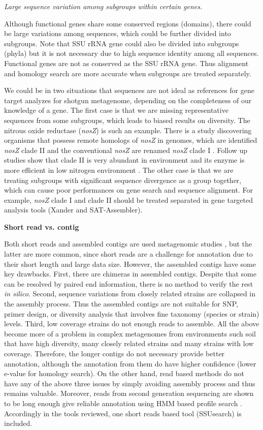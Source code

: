 \documentclass[]{msu-thesis}
\begin{document}
\textit{Large sequence variation among subgroups within certain genes. }

Although functional genes share some conserved regions (domains), there could be large variations among sequences, which could be further divided into subgroups. Note that SSU rRNA gene could also be divided into subgroups (phyla) but it is not necessary due to high sequence identity among all sequences. Functional genes are not as conserved as the SSU rRNA gene. Thus alignment and homology search are more accurate when subgroups are treated separately.

We could be in two situations that sequences are not ideal as references for gene target analyzes for shotgun metagenome, depending on the completeness of our knowledge of a gene. The first case is that we are missing representative sequences from some subgroups, which leads to biased results on diversity. The nitrous oxide reductase (\textit{nosZ}) is such an example. There is a study discovering organisms that possess remote homologs of \textit{nosZ} in genomes, which are identified \textit{nosZ} clade II and the conventional \textit{nosZ} are renamed \textit{nosZ} clade I \cite{sanford_unexpected_2012}. Follow up studies show that clade II is very abundant in environment and its enzyme is more efficient in low nitrogen environment \cite{yoon_nitrous_2016}.
The other case is that we are treating subgroups with significant sequence divergence as a group together, which can cause poor performances on gene search and sequence alignment. For example, \textit{nosZ} clade I and clade II should be treated separated in gene targeted analysis tools (Xander and SAT-Assembler).

\textbf{Short read vs. contig }

Both short reads and assembled contigs are used metagenomic studies \cite{fierer_cross-biome_2012,qin_human_2010,howe_tackling_2014}, but the latter are more common, since short reads are a challenge for annotation due to their short length and large data size. However, the assembled contigs have some key drawbacks. First, there are chimeras in assembled contigs. Despite that some can be resolved by paired end information, there is no method to verify the rest \textit{in silico}. Second, sequence variations from closely related strains are collapsed in the assembly process. Thus the assembled contigs are not suitable for SNP, primer design, or diversity analysis that involves fine taxonomy (species or strain) levels. Third, low coverage strains do not enough reads to assemble. All the above become more of a problem in complex metagenomes from environments such soil that have high diversity, many closely related strains and many strains with low coverage. Therefore, the longer contigs do not necessary provide better annotation, although the annotation from them do have higher confidence (lower e-value for homology search). On the other hand, read based methods do not have any of the above three issues by simply avoiding assembly process and thus remains valuable. Moreover, reads from second generation sequencing are shown to be long enough give reliable annotation using HMM based profile search \cite{zhang_metadomain:_2012}. Accordingly in the tools reviewed, one short reads based tool (SSUsearch) is included.
\end{document}
